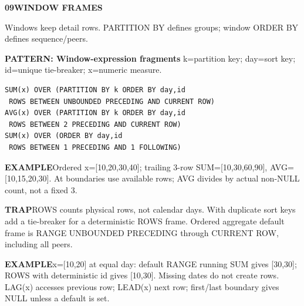 \documentclass[a4paper]{article}
\newcommand{\bodyfontsize}{5.55}
\newcommand{\bodyleading}{5.3}
\newcommand{\bodylineskiplimit}{-2pt}
\newcommand{\bodystyle}{%
  \fontsize{\bodyfontsize}{\bodyleading}\selectfont\setlength{\lineskiplimit}{\bodylineskiplimit}\RaggedRight
  \setlength{\abovedisplayskip}{.5pt}\setlength{\belowdisplayskip}{.5pt}%
  \setlength{\abovedisplayshortskip}{.3pt}\setlength{\belowdisplayshortskip}{.3pt}}
\newcommand{\topic}[2]{\par\addvspace{.45pt}\nointerlineskip%
  \begingroup\setlength{\fboxsep}{0.35pt}%
  \noindent\colorbox{structure}{\parbox{\dimexpr\linewidth-2\fboxsep\relax}{%
    \color{white}\fontsize{6.45}{6.8}\selectfont\bfseries #1\enspace #2}}%
  \endgroup\par\nobreak\vspace{.55pt}\nointerlineskip\nobreak}
\newenvironment{topicblock}
  {\par\bodystyle}
  {\par}
\newcommand{\key}[1]{\par\textcolor{structure}{\textbf{#1}}\enspace}
\newcommand{\note}[4]{\par\nointerlineskip\vspace{.25pt}\begingroup\setlength{\fboxsep}{0.1pt}%
  \noindent\colorbox{#1}{\parbox{\dimexpr\linewidth-2\fboxsep\relax}{%
    \RaggedRight\textcolor{#2}{\textbf{#3}}\enspace #4}}%
  \endgroup\par\nointerlineskip\vspace{.25pt}}
\newcommand{\trap}[1]{\note{warningbg}{warning}{TRAP}{#1}}
\newcommand{\ex}[1]{\note{examplebg}{example}{EXAMPLE}{#1}}
\newcommand{\pattern}[1]{\key{PATTERN: #1}}
\newlength{\sheetwidth}
\newenvironment{sheetcolumns}[1]
  {\noindent\begin{minipage}[t]{#1\sheetwidth}\vspace{0pt}\bodystyle\ignorespaces}
  {\end{minipage}\par}
\begin{document}
\begin{sheetcolumns}{.254}
\begin{topicblock}
\topic{09}{WINDOW FRAMES}
Windows keep detail rows. PARTITION BY defines groups; window ORDER BY defines sequence/peers.
\pattern{Window-expression fragments}
k=partition key; day=sort key; id=unique tie-breaker; x=numeric measure.
\begin{lstlisting}
SUM(x) OVER (PARTITION BY k ORDER BY day,id
 ROWS BETWEEN UNBOUNDED PRECEDING AND CURRENT ROW)
AVG(x) OVER (PARTITION BY k ORDER BY day,id
 ROWS BETWEEN 2 PRECEDING AND CURRENT ROW)
SUM(x) OVER (ORDER BY day,id
 ROWS BETWEEN 1 PRECEDING AND 1 FOLLOWING)
\end{lstlisting}
\ex{Ordered x=[10,20,30,40]; trailing 3-row SUM=[10,30,60,90], AVG=[10,15,20,30]. At boundaries use available rows; AVG divides by actual non-NULL count, not a fixed 3.}
\trap{ROWS counts physical rows, not calendar days. With duplicate sort keys add a tie-breaker for a deterministic ROWS frame. Ordered aggregate default frame is RANGE UNBOUNDED PRECEDING through CURRENT ROW, including all peers.}
\ex{x=[10,20] at equal day: default RANGE running SUM gives [30,30]; ROWS with deterministic id gives [10,30]. Missing dates do not create rows. LAG(x) accesses previous row; LEAD(x) next row; first/last boundary gives NULL unless a default is set.}
\end{topicblock}


\end{sheetcolumns}
\end{document}
